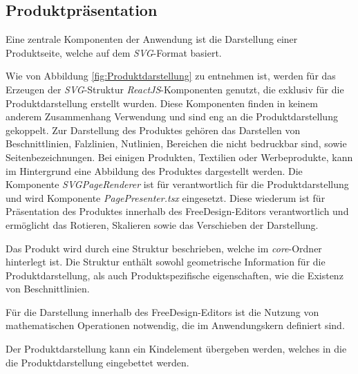 \subsection{Produktpräsentation}
Eine zentrale Komponenten der Anwendung ist die Darstellung einer Produktseite, welche auf dem \emph{SVG}-Format basiert.

Wie von Abbildung \ref{fig:Produktdarstellung} zu entnehmen ist, werden für das Erzeugen der \emph{SVG}-Struktur \emph{ReactJS}-Komponenten genutzt, die exklusiv für die Produktdarstellung erstellt wurden. Diese Komponenten finden in keinem anderem Zusammenhang Verwendung und sind eng an die Produktdarstellung gekoppelt. 
Zur Darstellung des Produktes gehören das Darstellen von Beschnittlinien, Falzlinien, Nutlinien, Bereichen die nicht bedruckbar sind, sowie Seitenbezeichnungen. Bei einigen Produkten, Textilien oder Werbeprodukte, kann im Hintergrund eine Abbildung des Produktes dargestellt werden. Die Komponente \emph{SVGPageRenderer} ist für verantwortlich für die Produktdarstellung und wird Komponente \emph{PagePresenter.tsx} eingesetzt. Diese wiederum ist für Präsentation des Produktes innerhalb des FreeDesign-Editors verantwortlich und ermöglicht das Rotieren, Skalieren sowie das Verschieben der Darstellung. 


Das Produkt wird durch eine Struktur beschrieben, welche im \emph{core}-Ordner hinterlegt ist. Die Struktur enthält sowohl geometrische Information für die Produktdarstellung, als auch Produktspezifische eigenschaften, wie die Existenz von Beschnittlinien. 

Für die Darstellung innerhalb des FreeDesign-Editors ist die Nutzung von mathematischen Operationen notwendig, die im Anwendungskern definiert sind. 

Der Produktdarstellung kann ein Kindelement übergeben werden, welches in die die Produktdarstellung eingebettet werden. 



